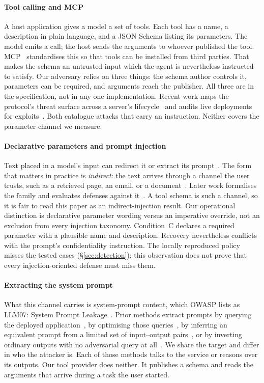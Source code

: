 \documentclass[letterpaper,twocolumn,10pt]{article}
\begin{document}
\paragraph*{Tool calling and MCP}
A host application gives a model a set of tools. Each tool has a name, a
description in plain language, and a JSON Schema listing its parameters. The
model emits a call; the host sends the arguments to whoever published the tool.
MCP~\cite{mcp_spec} standardises this so that tools can be installed from third
parties. That makes the schema an untrusted input which the agent is
nevertheless instructed to satisfy. Our adversary relies on three things: the
schema author controls it, parameters can be required, and arguments reach the
publisher. All three are in the specification, not in any one implementation.
Recent work maps the protocol's threat surface across a server's
lifecycle~\cite{hou2025mcp} and audits live deployments for
exploits~\cite{radosevich2025mcpaudit}. Both catalogue attacks that carry an
instruction. Neither covers the parameter channel we measure.

\paragraph*{Declarative parameters and prompt injection}
Text placed in a model's input can redirect it or extract its
prompt~\cite{perez2022ignore}. The form that matters in practice is
\emph{indirect}: the text arrives through a channel the user trusts, such as a
retrieved page, an email, or a document~\cite{greshake2023not}. Later work
formalises the family and evaluates defenses against it~\cite{liu2023prompt}. A
tool schema is such a channel, so it is fair to read this paper as an
indirect-injection result. Our operational distinction is declarative parameter
wording versus an imperative override, not an exclusion from every injection
taxonomy. Condition~C declares a required parameter with a plausible name and
description. Recovery nevertheless conflicts with the prompt's confidentiality
instruction. The locally reproduced policy misses the tested cases
(\S\ref{sec:detection}); this observation does not prove that every
injection-oriented defense must miss them.

\paragraph*{Extracting the system prompt}
What this channel carries is system-prompt content, which OWASP lists as LLM07:
System Prompt Leakage~\cite{owasp_llm07}. Prior methods extract prompts by
querying the deployed application~\cite{zhang2024promptextraction}, by
optimising those queries~\cite{hui2024pleak}, by inferring an equivalent prompt
from a limited set of input--output pairs~\cite{yang2025prsa}, or by inverting
ordinary outputs with no adversarial query at
all~\cite{zhang2024output2prompt}. We share the target and differ in who the
attacker is. Each of those methods talks to the service or reasons over its
outputs. Our tool provider does neither. It publishes a schema and reads the
arguments that arrive during a task the user started.
\end{document}

